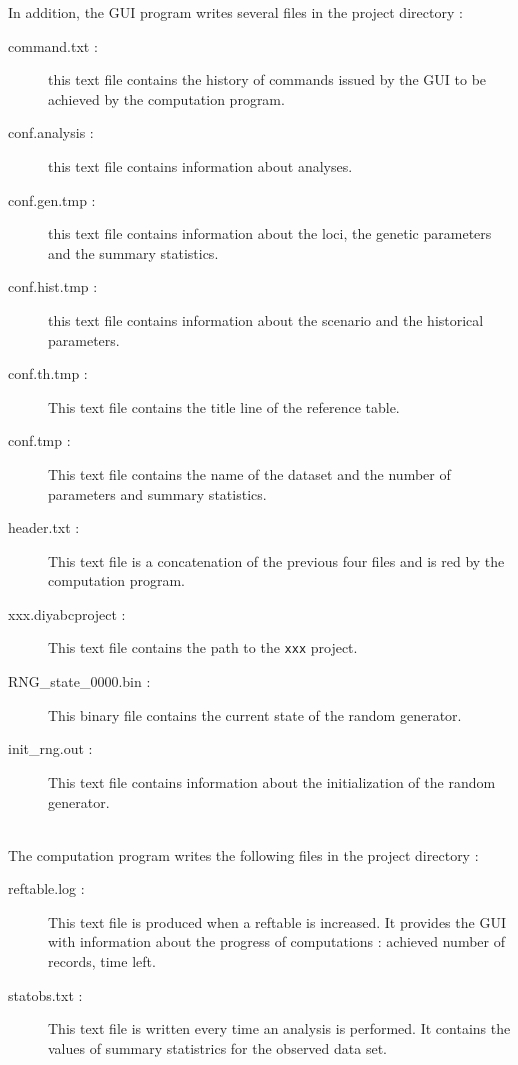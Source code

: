 In addition, the GUI program writes several files in the project directory :
\begin{description}
 \item [command.txt :] this text file contains the history of commands issued by the GUI to be achieved by the computation program.
 \item [conf.analysis :] this text file contains information about analyses.
 \item [conf.gen.tmp :] this text file contains information about the loci, the genetic parameters and the summary statistics.
 \item [conf.hist.tmp :] this text file contains information about the scenario and the historical parameters.
 \item [conf.th.tmp :] This text file contains the title line of the reference table.
 \item [conf.tmp :] This text file contains the name of the dataset and the number of parameters and summary statistics.
 \item [header.txt :] This text file is a concatenation of the previous four files and is red by the computation program.
 \item [xxx.diyabcproject :] This text file contains the path to the \texttt{xxx} project.
 \item [RNG\_state\_0000.bin :] This binary file contains the current state of the random generator.
 \item [init\_rng.out :] This text file contains information about the initialization of the random generator.
\end{description}
~\\

The computation program writes the following files in the project directory :
\begin{description}
 \item [reftable.log :] This text file is produced when a reftable is increased. It provides the GUI with information about the progress of computations : achieved number of records, time left.
 \item [statobs.txt :] This text file is written every time an analysis is performed. It contains the values of summary statistrics for the observed data set.
\end{description}

